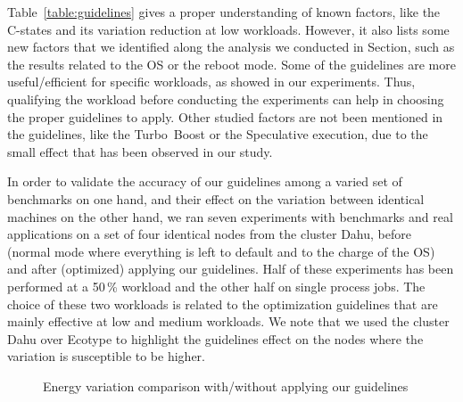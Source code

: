Table~\ref{table:guidelines} gives a proper understanding of known factors, like the C-states and its variation reduction at low workloads.
However, it also lists some new factors that we identified along the analysis we conducted in Section, such as the results related to the OS or the reboot mode.
Some of the guidelines are more useful/efficient for specific workloads, as showed in our experiments.
Thus, qualifying the workload before conducting the experiments can help in choosing the proper guidelines to apply.
Other studied factors are not been mentioned in the guidelines, like the Turbo~Boost or the Speculative execution, due to the small effect that has been observed in our study.

In order to validate the accuracy of our guidelines among a varied set of benchmarks on one hand, and their effect on the variation between identical machines on the other hand, we ran seven experiments with benchmarks and real applications on a set of four identical nodes from the cluster \textsf{Dahu}, before (\textsf{normal} mode where everything is left to default and to the charge of the OS) and after (\textsf{optimized}) applying our guidelines.
Half of these experiments has been performed at a 50\,\% workload and the other half on single process jobs.
The choice of these two workloads is related to the optimization guidelines that are mainly effective at low and medium workloads.
We note that we used the cluster \textsf{Dahu} over \textsf{Ecotype} to highlight the guidelines effect on the nodes where the variation is susceptible to be higher.

\begin{figure}%
    \caption{Energy variation comparison with/without applying our guidelines}\label{fig:optimized}
\end{figure}

